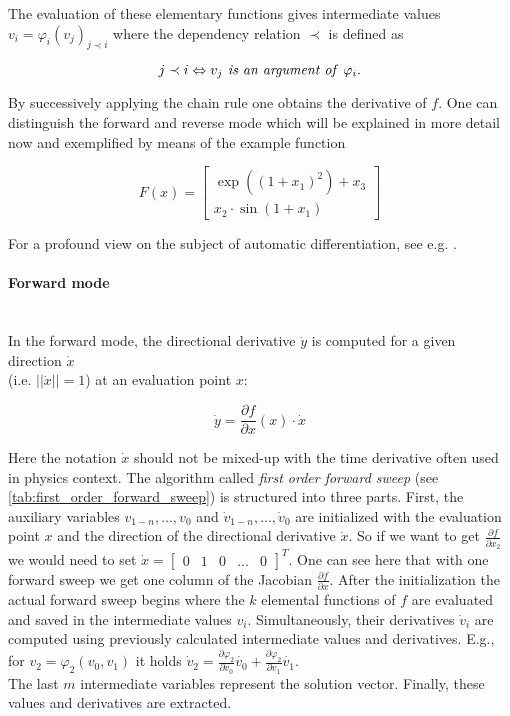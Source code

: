 \documentclass{scrartcl}[12pt, halfparskip]
\numberwithin{equation}{section}
\numberwithin{figure}{section}
\numberwithin{table}{section}
\begin{document}
The evaluation of these elementary functions gives intermediate values $v_i = \varphi_i(v_j)_{j \prec i}$ where the dependency relation $\prec$ is defined as

\begin{equation}
j \prec i \Leftrightarrow v_j \text{\textit{ is an argument of }} \varphi_i.
\end{equation}

By successively applying the chain rule one obtains the derivative of $f$.
One can distinguish the forward and reverse mode which will be explained in more detail now and exemplified by means of the example function

\begin{equation}
F(x) = 
\begin{bmatrix}
\exp((1+x_1)^2) + x_3 \\
x_2 \cdot \sin(1+x_1)
\end{bmatrix}
\label{eq:AD_example}
\end{equation}

For a profound view on the subject of automatic differentiation, see e.g. \cite{eval_derivatives_walther_griewank}.


\paragraph{Forward mode}\mbox{}\\
In the forward mode, the directional derivative $\dot{y}$ is computed for a given direction $\dot{x}$ \\ (i.e. $|| \dot{x} || = 1$) at an evaluation point $x$:

\begin{equation}
\dot{y} = \frac{\partial f}{\partial x}(x) \cdot \dot{x}
\end{equation}

Here the notation $\dot{x}$ should not be mixed-up with the time derivative often used in physics context.
The algorithm called \textit{first order forward sweep} (see \cref{tab:first_order_forward_sweep}) is structured into three parts. First, the auxiliary variables $v_{1-n},...,v_0$ and $\dot{v}_{1-n},...,\dot{v}_0$ are initialized with the evaluation point $x$ and the direction of the directional derivative $\dot{x}$. So if we want to get $\frac{\partial f}{\partial x_2}$ we would need to set $\dot{x} = \begin{bmatrix}
0 & 1 & 0 & \dots & 0
\end{bmatrix}^T$. One can see here that with one forward sweep we get one column of the Jacobian $ \frac{\partial f}{\partial x}$. 
After the initialization the actual forward sweep begins where the $k$ elemental functions of $f$ are evaluated and saved in the intermediate values $v_i$. Simultaneously, their derivatives  $\dot{v}_i$ are computed using previously calculated intermediate values and derivatives. E.g., for $v_2 = \varphi_2(v_0, v_1)$ it holds $\dot{v}_2 = \frac{\partial \varphi_2}{\partial v_0} \dot{v_0} + \frac{\partial \varphi_2}{\partial v_1} \dot{v_1}$. \\
The last $m$ intermediate variables represent the solution vector. Finally, these values and derivatives are extracted.
\end{document}
